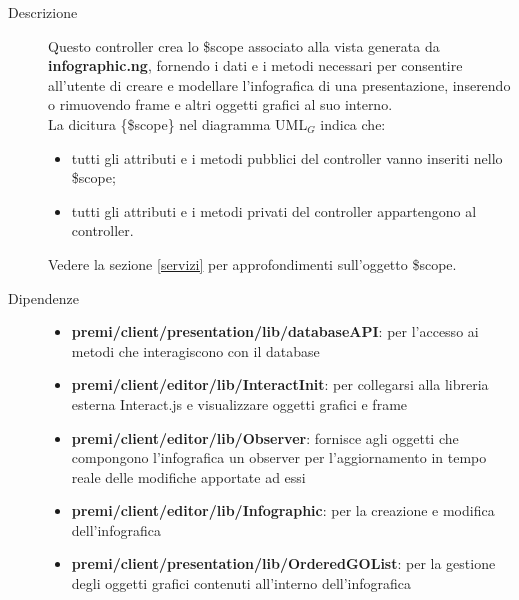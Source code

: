 \begin{description}
\item[Descrizione] \hfill
	Questo controller crea lo \$scope associato alla vista generata da \textbf{infographic.ng}, fornendo i dati e i metodi necessari per consentire all'utente di creare e modellare l'infografica di una presentazione, inserendo o rimuovendo frame e altri oggetti grafici al suo interno.
\\ La dicitura \{\$scope\} nel diagramma UML$_G$ indica che:
\begin{itemize}
\item tutti gli attributi e i metodi pubblici del controller vanno inseriti nello \$scope;
\item tutti gli attributi e i metodi privati del controller appartengono al controller.
\end{itemize}
Vedere la sezione \ref{servizi} per approfondimenti sull'oggetto \$scope.
	
	
	
\item[Dipendenze] \hfill
	\begin{itemize}
		\item \textbf{premi/client/presentation/lib/databaseAPI}: per l'accesso ai metodi che interagiscono con il database
		\item \textbf{premi/client/editor/lib/InteractInit}: per collegarsi alla libreria esterna Interact.js e visualizzare oggetti grafici e frame
		\item \textbf{premi/client/editor/lib/Observer}: fornisce agli oggetti che compongono l'infografica un observer per l'aggiornamento in tempo reale delle modifiche apportate ad essi
		\item \textbf{premi/client/editor/lib/Infographic}: per la creazione e modifica dell'infografica
	\item \textbf{premi/client/presentation/lib/OrderedGOList}: per la gestione degli oggetti grafici contenuti all'interno dell'infografica
	\end{itemize}
	

\end{description}
